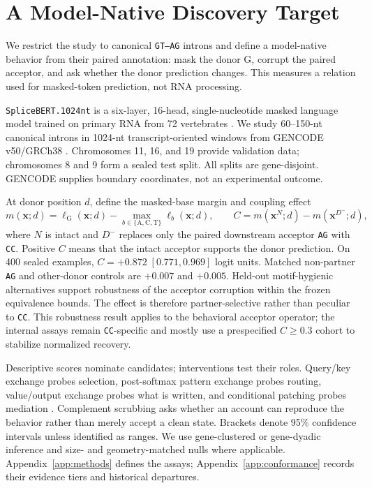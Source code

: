 \documentclass{article}
\begin{document}
\section{A Model-Native Discovery Target}
\label{sec:behavior}

We restrict the study to canonical \texttt{GT--AG} introns and define a model-native behavior from their paired annotation: mask the donor G, corrupt the paired acceptor, and ask whether the donor prediction changes. This measures a relation used for masked-token prediction, not RNA processing.

\texttt{SpliceBERT.1024nt} is a six-layer, 16-head, single-nucleotide masked language model trained on primary RNA from 72 vertebrates \citep{chen2024splicebert}. We study 60--150-nt canonical introns in 1024-nt transcript-oriented windows from GENCODE v50/GRCh38 \citep{mudge2025gencode}. Chromosomes 11, 16, and 19 provide validation data; chromosomes 8 and 9 form a sealed test split. All splits are gene-disjoint. GENCODE supplies boundary coordinates, not an experimental outcome.

At donor position \(d\), define the masked-base margin and coupling effect
\begin{equation}
m(\mathbf{x};d)=\ell_{\mathrm G}(\mathbf{x};d)
-\max_{b\in\{\mathrm{A,C,T}\}}\ell_b(\mathbf{x};d),\qquad
C=m(\mathbf{x}^{N};d)-m(\mathbf{x}^{D^-};d),
\label{eq:coupling}
\end{equation}
where \(N\) is intact and \(D^-\) replaces only the paired downstream acceptor \texttt{AG} with \texttt{CC}. Positive \(C\) means that the intact acceptor supports the donor prediction. On 400 sealed examples, \(C=+0.872\;[0.771,0.969]\) logit units. Matched non-partner \texttt{AG} and other-donor controls are \(+0.007\) and \(+0.005\). Held-out motif-hygienic alternatives support robustness of the acceptor corruption within the frozen equivalence bounds. The effect is therefore partner-selective rather than peculiar to \texttt{CC}. This robustness result applies to the behavioral acceptor operator; the internal assays remain \texttt{CC}-specific and mostly use a prespecified \(C\geq0.3\) cohort to stabilize normalized recovery.

Descriptive scores nominate candidates; interventions test their roles. Query/key exchange probes selection, post-softmax pattern exchange probes routing, value/output exchange probes what is written, and conditional patching probes mediation \citep{elhage2021framework}. Complement scrubbing asks whether an account can reproduce the behavior rather than merely accept a clean state. Brackets denote 95\% confidence intervals unless identified as ranges. We use gene-clustered or gene-dyadic inference and size- and geometry-matched nulls where applicable. Appendix~\ref{app:methods} defines the assays; Appendix~\ref{app:conformance} records their evidence tiers and historical departures.
\end{document}
